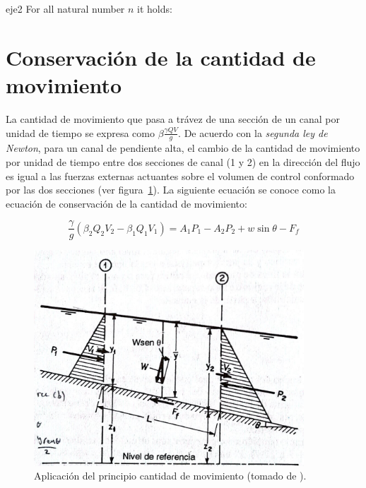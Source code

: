 \documentclass[11pt, oneside]{article}
\begin{document}
\begin{eje}{}{eje2}
  For all natural number $n$ it holds:
\end{eje}

\section{Conservaci\'on de la cantidad de movimiento}%
La cantidad de movimiento que pasa a tr\'avez de una secci\'on de un canal por unidad de tiempo se expresa como $\beta\frac{ \gamma Q V}{g}$. De acuerdo con la \emph{segunda ley de Newton}, para un canal de pendiente alta, el cambio de la cantidad de movimiento por unidad de tiempo entre dos secciones de canal (1 y 2) en la direcci\'on del flujo es igual a las fuerzas externas actuantes sobre el volumen de control conformado por las dos secciones (ver figura~\ref{fig11}). La siguiente ecuaci\'on se conoce como la ecuaci\'on de conservaci\'on de la cantidad de movimiento:

\begin{equation}
\frac{\gamma}{g}\left(\beta_2 Q_2 V_2 - \beta_1 Q_1 V_1 \right) = A_1 P_1 - A_2 P_2 + w \sin \theta - F_f
\label{ene10}
\end{equation}

\begin{figure}[h]
\centering
\includegraphics[width=0.9\textwidth]{fig37.jpeg}
\caption{Aplicaci\'on del principio  cantidad de movimiento (tomado de \cite{VChow}).}
\label{fig11}
\end{figure}
\end{document}
